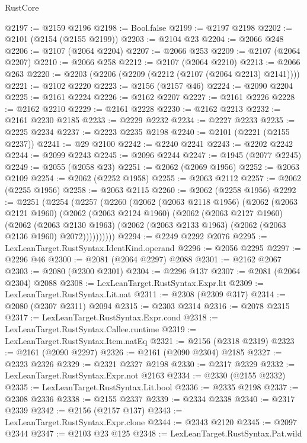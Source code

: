 \begin{lexlean}{RustCore}
\begin{coremodule}
@2197 := @2159 @2196
@2198 := Bool.false
@2199 := @2197 @2198
@2202 := @2101 (@2154 (@2155 @2199))
@2203 := @2104 @23
@2204 := @2066 @248
@2206 := @2107 (@2064 @2204)
@2207 := @2066 @253
@2209 := @2107 (@2064 @2207)
@2210 := @2066 @258
@2212 := @2107 (@2064 @2210)
@2213 := @2066 @263
@2220 := @2203 (@2206 (@2209 (@2212 (@2107 (@2064 @2213) @2141))))
@2221 := @2102 @2220
@2223 := @2156 (@2157 @46)
@2224 := @2090 @2204
@2225 := @2161 @2224
@2226 := @2162 @2207
@2227 := @2161 @2226
@2228 := @2162 @2210
@2229 := @2161 @2228
@2230 := @2162 @2213
@2232 := @2161 @2230 @2185
@2233 := @2229 @2232
@2234 := @2227 @2233
@2235 := @2225 @2234
@2237 := @2223 @2235 @2198
@2240 := @2101 (@2221 (@2155 @2237))
@2241 := @29 @2100
@2242 := @2240 @2241
@2243 := @2202 @2242
@2244 := @2099 @2243
@2245 := @2096 @2244
@2247 := @1945 (@2077 @2245)
@2249 := @2055 (@2058 @23)
@2251 := @2062 (@2069 @1956)
@2252 := @2063 @2109
@2254 := @2062 (@2252 @1958)
@2255 := @2063 @2112
@2257 := @2062 (@2255 @1956)
@2258 := @2063 @2115
@2260 := @2062 (@2258 @1956)
@2292 := @2251
    (@2254
      (@2257
        (@2260
          (@2062
            (@2063 @2118 @1956)
            (@2062
              (@2063 @2121 @1960)
              (@2062
                (@2063 @2124 @1960)
                (@2062
                  (@2063 @2127 @1960)
                  (@2062
                    (@2063 @2130 @1963)
                    (@2062 (@2063 @2133 @1963) (@2062 (@2063 @2136 @1960) @2072))))))))))
@2294 := @2249 @2292 @2076
@2295 := LexLeanTarget.RustSyntax.IdentKind.operand
@2296 := @2056 @2295
@2297 := @2296 @46
@2300 := @2081 (@2064 @2297) @2088
@2301 := @2162 @2067
@2303 := @2080 (@2300 @2301)
@2304 := @2296 @137
@2307 := @2081 (@2064 @2304) @2088
@2308 := LexLeanTarget.RustSyntax.Expr.lit
@2309 := LexLeanTarget.RustSyntax.Lit.nat
@2311 := @2308 (@2309 @317)
@2314 := @2080 (@2307 @2311) @2094
@2315 := @2303 @2314
@2316 := @2078 @2315
@2317 := LexLeanTarget.RustSyntax.Expr.cond
@2318 := LexLeanTarget.RustSyntax.Callee.runtime
@2319 := LexLeanTarget.RustSyntax.Item.natEq
@2321 := @2156 (@2318 @2319)
@2323 := @2161 (@2090 @2297)
@2326 := @2161 (@2090 @2304) @2185
@2327 := @2323 @2326
@2329 := @2321 @2327 @2198
@2330 := @2317 @2329
@2332 := LexLeanTarget.RustSyntax.Expr.not @2163
@2334 := @2330 (@2155 @2332)
@2335 := LexLeanTarget.RustSyntax.Lit.bool
@2336 := @2335 @2198
@2337 := @2308 @2336
@2338 := @2155 @2337
@2339 := @2334 @2338
@2340 := @2317 @2339
@2342 := @2156 (@2157 @137)
@2343 := LexLeanTarget.RustSyntax.Expr.clone
@2344 := @2343 @2120
@2345 := @2097 @2344
@2347 := @2103 @23 @125
@2348 := LexLeanTarget.RustSyntax.Pat.wild

\end{coremodule}
\end{lexlean}
